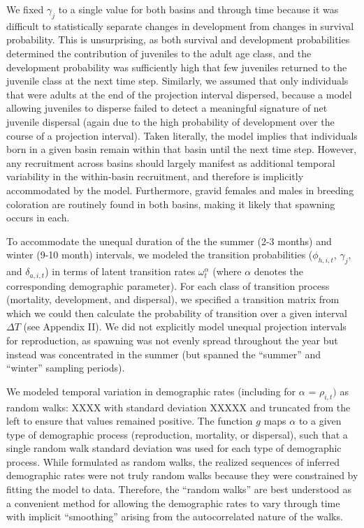 %
We fixed $\gamma_{j}$ to a single value for both basins and through time because
it was difficult to statistically separate changes in development from changes
in survival probability.
This is unsurprising, as both survival and development probabilities
determined the contribution of juveniles to the adult age class,
and the development probability was sufficiently
high that few juveniles returned to the juvenile class at the next time step.
Similarly, we assumed that only individuals that were adults at the end of the projection
interval dispersed, because a model allowing juveniles to disperse failed to detect
a meaningful signature of net juvenile dispersal
(again due to the high probability of development over the course of a projection interval).
Taken literally, the model implies that individuals born in a given basin
remain within that basin until the next time step.
However, any recruitment across basins should largely manifest
as additional temporal variability in the within-basin recruitment,
and therefore is implicitly accommodated by the model.
Furthermore, gravid females and males in breeding coloration are
routinely found in both basins, making it likely that spawning occurs in each.

To accommodate the unequal duration of the the summer (2-3 months) and winter (9-10 month)
intervals, we modeled the transition probabilities
($\phi_{h,i,t}$, $\gamma_{j}$, and $\delta_{a,i,t}$)
in terms of latent transition rates $\omega^{\alpha}_{t}$
(where $\alpha$ denotes the corresponding demographic parameter).
For each class of transition process (mortality, development, and dispersal),
we specified a transition matrix from which we could then calculate
the probability of transition over a given interval $\Delta T$
(see Appendix II).
We did not explicitly model unequal projection intervals for reproduction,
as spawning was not evenly spread throughout the year but instead was concentrated
in the summer (but spanned the ``summer'' and ``winter'' sampling periods).

We modeled temporal variation in demographic rates
(including for $\alpha$ = $\rho_{i,t})$ as random walks:
%
XXXX
%
with standard deviation XXXXX and
truncated from the left to ensure that values remained positive.
The function $g$ maps $\alpha$ to a given type of demographic process
(reproduction, mortality, or dispersal),
such that a single random walk standard deviation was used
for each type of demographic process.
While formulated as random walks,
the realized sequences of inferred demographic rates
were not truly random walks because they were constrained by fitting the model to data.
Therefore, the ``random walks'' are best understood as a convenient method
for allowing the demographic rates to vary through time with implicit ``smoothing''
arising from the autocorrelated nature of the walks.

